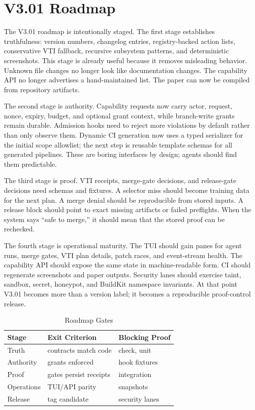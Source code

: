 \documentclass[conference]{IEEEtran}
\begin{document}
\section{V3.01 Roadmap}
The V3.01 roadmap is intentionally staged. The first stage establishes truthfulness: version numbers, changelog entries, registry-backed action lists, conservative VTI fallback, recursive subsystem patterns, and deterministic screenshots. This stage is already useful because it removes misleading behavior. Unknown file changes no longer look like documentation changes. The capability API no longer advertises a hand-maintained list. The paper can now be compiled from repository artifacts.

The second stage is authority. Capability requests now carry actor, request, nonce, expiry, budget, and optional grant context, while branch-write grants remain durable. Admission hooks need to reject more violations by default rather than only observe them. Dynamic CI generation now uses a typed serializer for the initial scope allowlist; the next step is reusable template schemas for all generated pipelines. These are boring interfaces by design; agents should find them predictable.

The third stage is proof. VTI receipts, merge-gate decisions, and release-gate decisions need schemas and fixtures. A selector miss should become training data for the next plan. A merge denial should be reproducible from stored inputs. A release block should point to exact missing artifacts or failed preflights. When the system says ``safe to merge,'' it should mean that the stored proof can be rechecked.

The fourth stage is operational maturity. The TUI should gain panes for agent runs, merge gates, VTI plan details, patch races, and event-stream health. The capability API should expose the same state in machine-readable form. CI should regenerate screenshots and paper outputs. Security lanes should exercise taint, sandbox, secret, honeypot, and BuildKit namespace invariants. At that point V3.01 becomes more than a version label; it becomes a reproducible proof-control release.

\begin{table}[t]
\caption{Roadmap Gates}
\centering
\begin{tabular}{lll}
\toprule
Stage & Exit Criterion & Blocking Proof\\
\midrule
Truth & contracts match code & check, unit\\
Authority & grants enforced & hook fixtures\\
Proof & gates persist receipts & integration\\
Operations & TUI/API parity & snapshots\\
Release & tag candidate & security lanes\\
\bottomrule
\end{tabular}
\end{table}
\end{document}
